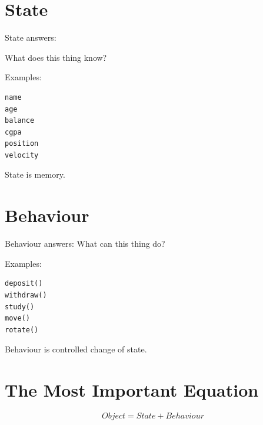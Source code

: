 \documentclass[11pt,a4paper]{book}
\begin{document}

\section{State}

\begin{idea}

State answers:

What does this thing know?

\end{idea}

Examples:

\begin{verbatim}
name
age
balance
cgpa
position
velocity
\end{verbatim}

\begin{rosettarule}
State is memory.
\end{rosettarule}


\section{Behaviour}

\begin{idea}

Behaviour answers:
    What can this thing do?

\end{idea}

Examples:

\begin{verbatim}
deposit()
withdraw()
study()
move()
rotate()
\end{verbatim}

\begin{rosettarule}
Behaviour is controlled change of state.
\end{rosettarule}


\section{The Most Important Equation}


\[
Object = State + Behaviour
\]


\end{document}
